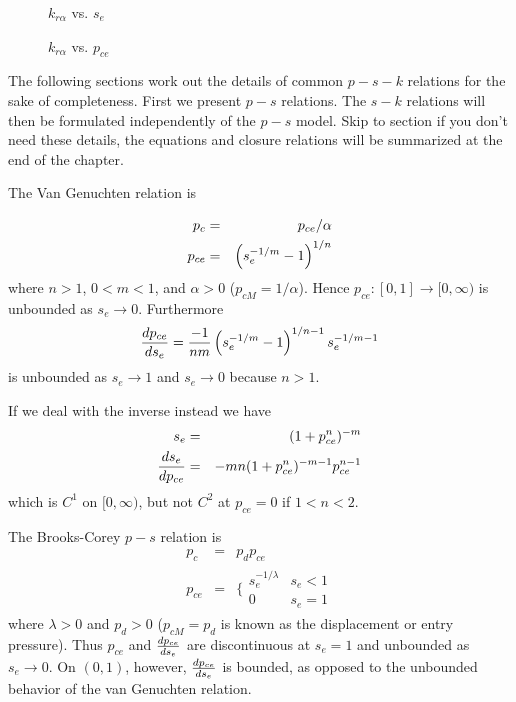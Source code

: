 \documentclass[10pt,dvips,twoside,reqno]{amsart}
\begin{document}
\begin{figure}
\center
\caption{$k_{r \alpha}$ vs. $s_e$ \label{krplot}}
\end{figure}

\begin{figure}
\center
\caption{$k_{r \alpha}$ vs. $p_{ce}$ \label{krvpcplot}}
\end{figure}

The following sections work out the details of common $p-s-k$
relations for the sake of completeness. First we present $p-s$
relations. The $s-k$ relations will then be formulated independently
of the $p-s$ model. Skip to section  if you don't need
these details, the equations and closure relations will be summarized
at the end of the chapter.

 The Van Genuchten relation is
\citep{VanGenuchten_80}

\begin{eqnarray}
p_c &=& p_{ce}/\alpha\\
p_{ce} &=& \left( s_e^{-1/m} - 1 \right)^{1/n} 
\end{eqnarray}
where $n>1$, $0<m<1$, and $\alpha > 0$ ($p_{cM} = 1/\alpha$). Hence
$p_{ce}:[0,1]\rightarrow [0,\infty)$ is unbounded as $s_e
\rightarrow 0$. Furthermore
\begin{equation}
\frac{d {p_{ce}}}{d {s_e}} = \frac{-1}{nm}\left( s_e^{-1/m} - 1 \right)^{1/n-1} s_e^{-1/m-1}
\end{equation}
is unbounded as $s_e \rightarrow 1$ and $s_e \rightarrow 0$
because $n>1$.

If we deal with the inverse instead we have
\begin{eqnarray}
s_e &=& ( 1 + p_{ce}^n)^{-m} \\
\frac{d {s_e}}{d {p_{ce}}} &=& -mn( 1 + p_{ce}^n )^{-m-1} p_{ce}^{n-1} 
\end{eqnarray}
which is $C^1$ on $[0,\infty)$, but not $C^2$ at $p_{ce}=0$ if $1<n<2$.

 The Brooks-Corey $p - s$ relation is
\cite{Brooks_Corey_66}
\begin{eqnarray}
p_c &=& p_d p_{ce} \\
p_{ce} &=& \Big\{ \begin{array}{ll}
s_e^{-1/\lambda} & s_e < 1   \\
0 & s_e = 1 
\end{array}
\end{eqnarray}
where $\lambda > 0$ and $p_d>0$ ($p_{cM} = p_d$ is known as the
displacement or entry pressure). Thus $p_{ce}$ and $\frac{d {p_{ce}}}{d {s_e}}$
are discontinuous at $s_e=1$ and unbounded as $s_e \rightarrow 0$. On
$(0,1)$, however, $\frac{d {p_{ce}}}{d {s_e}}$ is bounded, as opposed to
the unbounded behavior of the van Genuchten relation.
\end{document}
